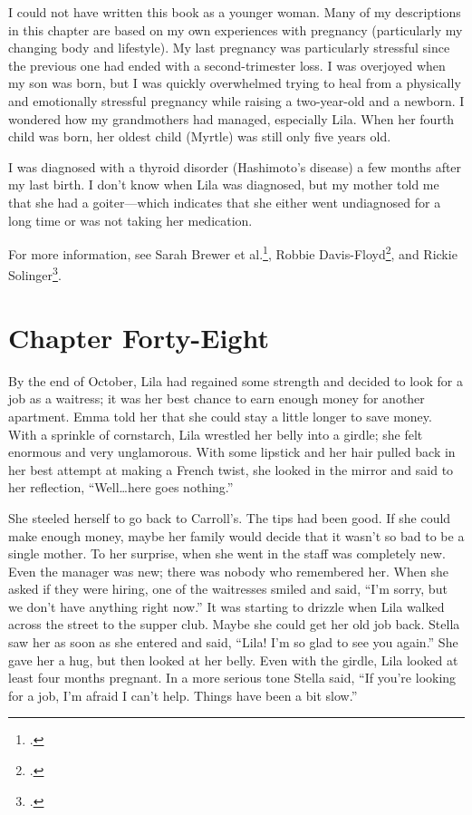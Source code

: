 \documentclass[
  letterpaper,
]{book}
\begin{document}
I could not have written this book as a younger woman. Many of my
descriptions in this chapter are based on my own experiences with
pregnancy (particularly my changing body and lifestyle). My last
pregnancy was particularly stressful since the previous one had ended
with a second-trimester loss. I was overjoyed when my son was born, but
I was quickly overwhelmed trying to heal from a physically and
emotionally stressful pregnancy while raising a two-year-old and a
newborn. I wondered how my grandmothers had managed, especially Lila.
When her fourth child was born, her oldest child (Myrtle) was still only
five years old.

I was diagnosed with a thyroid disorder (Hashimoto's disease) a few
months after my last birth. I don't know when Lila was diagnosed, but my
mother told me that she had a goiter---which indicates that she either
went undiagnosed for a long time or was not taking her medication.

For more information, see Sarah Brewer et al.\footnote{.}, Robbie
Davis-Floyd\footnote{.}, and Rickie Solinger\footnote{.}.


\chapter{Chapter Forty-Eight}\label{chapter-forty-eight}

By the end of October, Lila had regained some strength and decided to
look for a job as a waitress; it was her best chance to earn enough
money for another apartment. Emma told her that she could stay a little
longer to save money. With a sprinkle of cornstarch, Lila wrestled her
belly into a girdle; she felt enormous and very unglamorous. With some
lipstick and her hair pulled back in her best attempt at making a French
twist, she looked in the mirror and said to her reflection,
``Well\ldots here goes nothing.''

She steeled herself to go back to Carroll's. The tips had been good. If
she could make enough money, maybe her family would decide that it
wasn't so bad to be a single mother. To her surprise, when she went in
the staff was completely new. Even the manager was new; there was nobody
who remembered her. When she asked if they were hiring, one of the
waitresses smiled and said, ``I'm sorry, but we don't have anything
right now.'' It was starting to drizzle when Lila walked across the
street to the supper club. Maybe she could get her old job back. Stella
saw her as soon as she entered and said, ``Lila! I'm so glad to see you
again.'' She gave her a hug, but then looked at her belly. Even with the
girdle, Lila looked at least four months pregnant. In a more serious
tone Stella said, ``If you're looking for a job, I'm afraid I can't
help. Things have been a bit slow.''
\end{document}

